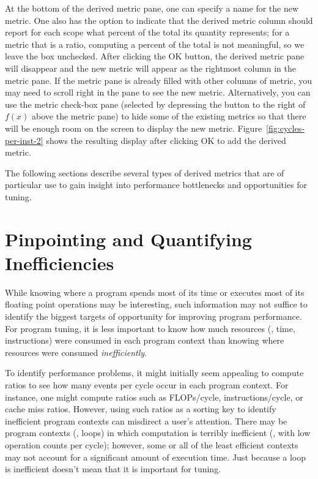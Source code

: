 \documentclass[11pt,twoside,letterpaper]{report}
\begin{document}
At the bottom of the derived metric pane, one can specify a name for the new metric.
One also has the option to indicate that the derived metric column should report for each scope what percent of the total its quantity represents; for a metric that is a ratio, computing a percent of the total is not meaningful, so we leave the box unchecked.
After clicking the OK button, the derived metric pane will disappear and the new metric will appear as the rightmost column in the metric pane.
If the metric pane is already filled with other columns of metric, you may need to scroll right in the pane to see the new metric.
Alternatively, you can use the metric check-box pane (selected by depressing the button to the right of $f(x)$ above the metric pane) to hide some of the existing metrics so that there will be enough room on the screen to display the new metric.
Figure~\ref{fig:cycles-per-inst-2} shows the resulting \hpcviewer{} display after clicking OK to add the derived metric.

The following sections describe several types of derived metrics that are of particular use to gain insight into performance bottlenecks and opportunities for tuning.


\section{Pinpointing and Quantifying Inefficiencies}
\label{sec:effective-performance-analysis:inefficiencies}

While knowing where a program spends most of its time or executes most of its floating point operations may be interesting, such information may not suffice to identify the biggest targets of opportunity for improving program performance.
For program tuning, it is less important to know how much resources (\eg, time, instructions) were consumed in each program context than knowing where resources were consumed {\em inefficiently}.

To identify performance problems, it might initially seem appealing to compute ratios to see how many events per cycle occur in each program context.
For instance, one might compute ratios such as FLOPs/cycle, instructions/cycle, or cache miss ratios.
However, using such ratios as a sorting key to identify inefficient program contexts can misdirect a user's attention.
There may be program contexts (\eg, loops) in which computation is terribly inefficient (\eg, with low operation counts per cycle); however, some or all of the least efficient contexts may not account for a significant amount of execution time.
Just because a loop is inefficient doesn't mean that it is important for tuning.
\end{document}
